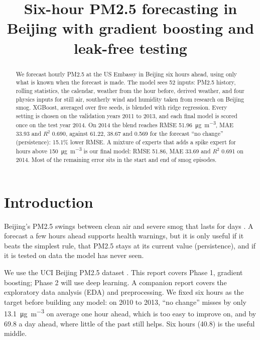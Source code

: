 \documentclass[conference]{IEEEtran}
\newcommand{\ugm}{\si{\micro\gram\per\cubic\metre}}
\begin{document}
\title{Six-hour PM2.5 forecasting in Beijing with gradient boosting and leak-free testing}

\author{
}

\maketitle

\begin{abstract}
We forecast hourly PM2.5 at the US Embassy in Beijing six hours ahead, using only what is known when the forecast is made. The model sees 52 inputs: PM2.5 history, rolling statistics, the calendar, weather from the hour before, derived weather, and four physics inputs for still air, southerly wind and humidity taken from research on Beijing smog. XGBoost, averaged over five seeds, is blended with ridge regression. Every setting is chosen on the validation years 2011 to 2013, and each final model is scored once on the test year 2014. On 2014 the blend reaches RMSE 51.96~\ugm, MAE 33.93 and $R^2$ 0.690, against 61.22, 38.67 and 0.569 for the forecast ``no change'' (persistence): 15.1\% lower RMSE. A mixture of experts that adds a spike expert for hours above 150~\ugm{} is our final model: RMSE 51.86, MAE 33.69 and $R^2$ 0.691 on 2014. Most of the remaining error sits in the start and end of smog episodes.
\end{abstract}

\section{Introduction}
Beijing's PM2.5 swings between clean air and severe smog that lasts for days \cite{liang2015}. A forecast a few hours ahead supports health warnings, but it is only useful if it beats the simplest rule, that PM2.5 stays at its current value (persistence), and if it is tested on data the model has never seen.

We use the UCI Beijing PM2.5 dataset \cite{uci}. This report covers Phase 1, gradient boosting; Phase 2 will use deep learning. A companion report \cite{datareport} covers the exploratory data analysis (EDA) and preprocessing. We fixed six hours as the target before building any model: on 2010 to 2013, ``no change'' misses by only 13.1~\ugm{} on average one hour ahead, which is too easy to improve on, and by 69.8 a day ahead, where little of the past still helps. Six hours (40.8) is the useful middle.
\end{document}
